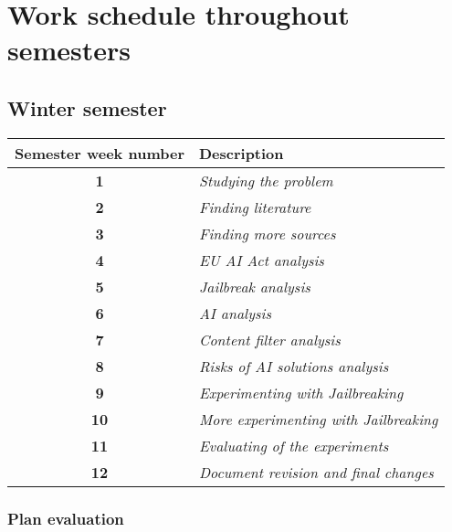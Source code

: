 \setcounter{figure}{0}
\setcounter{listing}{0}

\chapter{Work schedule throughout semesters \label{cha:work_schedule} }

\section*{Winter semester}

\begin{table}[hp]
    \centering
    \begin{tabular}{|c|l|}
    \hline
    \cellcolor[gray]{0.8}\textbf{Semester week number} & \cellcolor[gray]{0.8}\textbf{Description} \\ \hline

    \textbf{1} & \textit{Studying the problem} \\ \hline
    \textbf{2} & \textit{Finding literature} \\ \hline
    \textbf{3} & \textit{Finding more sources} \\ \hline
    \textbf{4} & \textit{EU AI Act analysis} \\ \hline
    \textbf{5} & \textit{Jailbreak analysis} \\ \hline
    \textbf{6} & \textit{AI analysis} \\ \hline
    \textbf{7} & \textit{Content filter analysis} \\ \hline
    \textbf{8} & \textit{Risks of AI solutions analysis} \\ \hline
    \textbf{9} & \textit{Experimenting with Jailbreaking} \\ \hline
    \textbf{10} & \textit{More experimenting with Jailbreaking} \\ \hline
    \textbf{11} & \textit{Evaluating of the experiments} \\ \hline
    \textbf{12} & \textit{Document revision and final changes} \\ \hline
    \end{tabular}
\end{table}

\subsection*{Plan evaluation}

